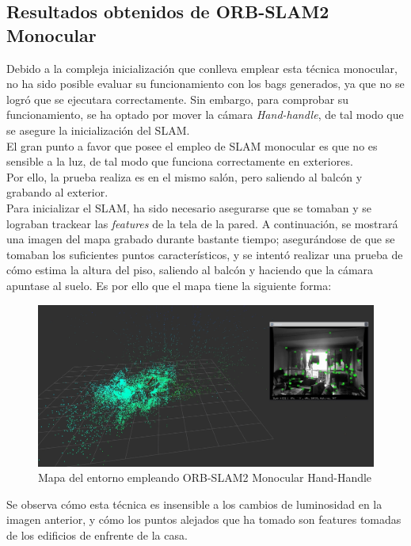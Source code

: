 \subsection{Resultados obtenidos de ORB-SLAM2 Monocular}
Debido a la compleja inicialización que conlleva emplear esta técnica monocular, no ha sido posible evaluar su funcionamiento con los bags generados, ya que no se logró que se ejecutara correctamente. Sin embargo, para comprobar su funcionamiento, se ha optado por mover la cámara \textit{Hand-handle}, de tal modo que se asegure la inicialización del SLAM. \\
El gran punto a favor que posee el empleo de SLAM monocular es que no es sensible a la luz, de tal modo que funciona correctamente en exteriores. \\
Por ello, la prueba realiza es en el mismo salón, pero saliendo al balcón y grabando al exterior. \\

Para inicializar el SLAM, ha sido necesario asegurarse que se tomaban y se lograban trackear las \textit{features} de la tela de la pared. A continuación, se mostrará una imagen
del mapa grabado durante bastante tiempo; asegurándose de que se tomaban los suficientes puntos característicos, y se intentó realizar una prueba de cómo estima la altura del piso, 
saliendo al balcón y haciendo que la cámara apuntase al suelo. Es por ello que el mapa tiene la siguiente forma:

\begin{figure}[h!]
    \centering
    \includegraphics[width=.9\textwidth]{images/slam/mono}
    \caption{Mapa del entorno empleando ORB-SLAM2 Monocular Hand-Handle}
\end{figure}

Se observa cómo esta técnica es insensible a los cambios de luminosidad en la imagen anterior, y cómo los puntos alejados que ha tomado son features tomadas de los edificios de enfrente de la
casa.
